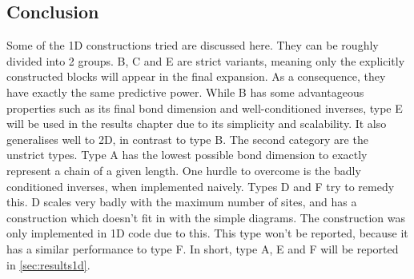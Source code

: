 \subsection{Conclusion}

Some of the 1D constructions tried are discussed here. They can be roughly divided into 2 groups. B, C and E are strict variants, meaning only the explicitly constructed blocks will appear in the final expansion. As a consequence, they have exactly the same predictive power. While B has some advantageous properties such as its final bond dimension and well-conditioned inverses, type E will be used in the results chapter due to its simplicity and scalability. It also generalises well to 2D, in contrast to type B.
The second category are the unstrict types. Type A has the lowest possible bond dimension to exactly represent a chain of a given length. One hurdle to overcome is the badly conditioned inverses, when implemented naively. Types D and F try to remedy this. D scales very badly with the maximum number of sites, and has a construction which doesn't fit in with the simple diagrams. The construction was only implemented in 1D code due to this. This type won't be reported, because it has  a similar performance to type F.
In short, type A, E and F will be reported in \cref{sec:results1d}.